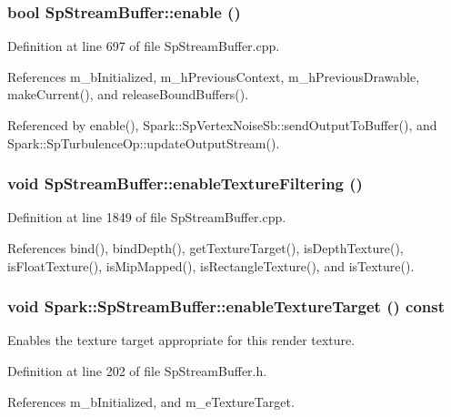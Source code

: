 \subsubsection{\setlength{\rightskip}{0pt plus 5cm}bool Sp\-Stream\-Buffer::enable ()}\label{classSpark_1_1SpStreamBuffer_a6}


Definition at line 697 of file Sp\-Stream\-Buffer.cpp.

References m\_\-b\-Initialized, m\_\-h\-Previous\-Context, m\_\-h\-Previous\-Drawable, make\-Current(), and release\-Bound\-Buffers().

Referenced by enable(), Spark::Sp\-Vertex\-Noise\-Sb::send\-Output\-To\-Buffer(), and Spark::Sp\-Turbulence\-Op::update\-Output\-Stream().
\subsubsection{\setlength{\rightskip}{0pt plus 5cm}void Sp\-Stream\-Buffer::enable\-Texture\-Filtering ()}\label{classSpark_1_1SpStreamBuffer_a12}


Definition at line 1849 of file Sp\-Stream\-Buffer.cpp.

References bind(), bind\-Depth(), get\-Texture\-Target(), is\-Depth\-Texture(), is\-Float\-Texture(), is\-Mip\-Mapped(), is\-Rectangle\-Texture(), and is\-Texture().
\subsubsection{\setlength{\rightskip}{0pt plus 5cm}void Spark::Sp\-Stream\-Buffer::enable\-Texture\-Target () const\hspace{0.3cm}{\tt  [inline]}}\label{classSpark_1_1SpStreamBuffer_a13}


Enables the texture target appropriate for this render texture. 

Definition at line 202 of file Sp\-Stream\-Buffer.h.

References m\_\-b\-Initialized, and m\_\-e\-Texture\-Target.
